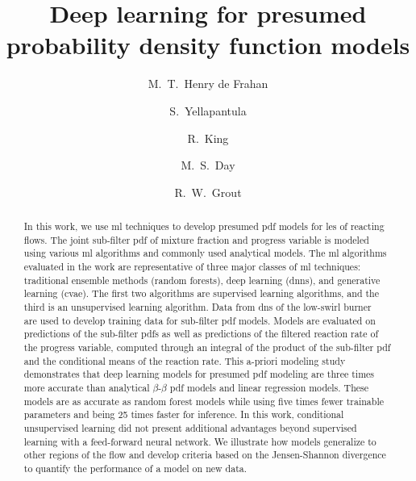 \documentclass[review]{elsarticle}
\begin{document}
\begin{frontmatter}

\title{Deep learning for presumed probability density function models}

\author[main]{M.~T.~Henry de Frahan}

\author[main]{S.~Yellapantula}

\author[main2]{R.~King}

\author[lbnl]{M.~S.~Day}

\author[main]{R.~W.~Grout}


\address[main]{High Performance Algorithms and Complex Fluids, Computational Science Center, National Renewable Energy Laboratory, 15013 Denver W Pkwy, ESIF301, Golden, CO 80401, USA}
\address[main2]{Complex Systems Simulation and Optimization Group, Computational Science Center, National Renewable Energy Laboratory, 15013 Denver W Pkwy, ESIF301, Golden, CO 80401, USA}
\address[lbnl]{Center for Computational Sciences and Engineering, Lawrence Berkeley National Laboratory, Berkeley, CA 94720, USA}

\begin{abstract}
  In this work, we use \gls{ml} techniques to develop presumed
  \gls{pdf} models for \acrlong{les} of reacting flows. The joint
  sub-filter \gls{pdf} of mixture fraction and progress variable is
  modeled using various \gls{ml} algorithms and commonly used
  analytical models. The \gls{ml} algorithms evaluated in the work are
  representative of three major classes of \gls{ml} techniques:
  traditional ensemble methods (random forests), deep learning
  (\acrlong{dnn}s), and generative learning (\gls{cvae}). The first
  two algorithms are supervised learning algorithms, and the third is
  an unsupervised learning algorithm. Data from \acrlong{dns} of the
  low-swirl burner~\cite{Day2012} are used to develop training data
  for sub-filter \gls{pdf} models. Models are evaluated on predictions
  of the sub-filter \glspl{pdf} as well as predictions of the filtered
  reaction rate of the progress variable, computed through an integral
  of the product of the sub-filter \gls{pdf} and the conditional means
  of the reaction rate. This a-priori modeling study demonstrates that
  deep learning models for presumed \gls{pdf} modeling are three times
  more accurate than analytical $\beta$-$\beta$ \gls{pdf} models and
  linear regression models. These models are as accurate as random
  forest models while using five times fewer trainable parameters and
  being 25 times faster for inference. In this work, conditional
  unsupervised learning did not present additional advantages beyond
  supervised learning with a feed-forward neural network. We
  illustrate how models generalize to other regions of the flow and
  develop criteria based on the Jensen-Shannon divergence to quantify
  the performance of a model on new data.
\end{abstract}


\end{frontmatter}
\end{document}
